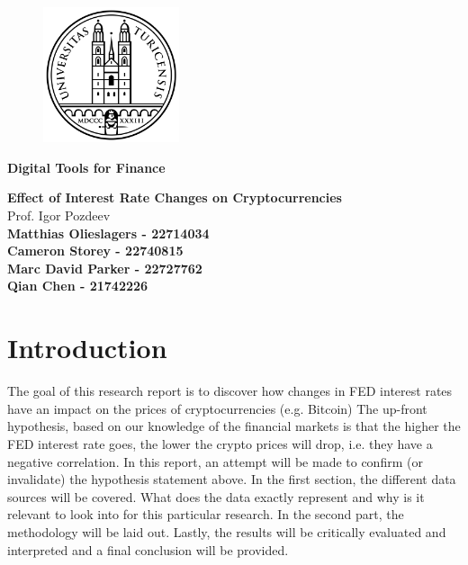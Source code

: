 \documentclass[12pt]{article}
\begin{document}
\pagestyle{empty}

\bigskip

\begin{figure}[htp]
    \centering
    \includegraphics[width=4cm]{uzh logo 2.png}
    \label{fig:UZH}
\end{figure}

\begin{Large}
	\begin{center}
		\textbf{Digital Tools for Finance}
	\end{center}
\end{Large}

\vspace{2cm}

\begin{large}	
	\begin{center}
		\textbf{Effect of Interest Rate Changes on Cryptocurrencies} \vspace{0.1cm} \\ {Prof. Igor Pozdeev } \vspace{2cm} \\ \textbf{Matthias Olieslagers - 22714034}  \\ \textbf{
Cameron Storey - 22740815} \\
        \textbf{Marc David Parker - 22727762}\\
        \textbf{Qian Chen - 21742226}\\
	\end{center}
\end{large}

\tableofcontents

\newpage

\bigskip
\section{Introduction}

The goal of this research report is to discover how changes in FED interest rates have an impact on the prices of cryptocurrencies (e.g. Bitcoin) \newline
The up-front hypothesis, based on our knowledge of the financial markets is that the higher the FED interest rate goes, the lower the crypto prices will drop, i.e. they have a negative correlation. In this report, an attempt will be made to  confirm (or invalidate) the hypothesis statement above. \newline
In the first section, the different data sources will be covered. What does the data exactly represent and why is it relevant to look into for this particular research. In the second part, the methodology will be laid out. Lastly, the results will be critically evaluated and interpreted and a final conclusion will be provided. 
\end{document}
